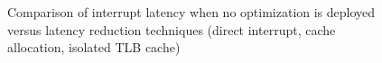 \begin{figure}[!htb]
\begin{center}
\begin{tikzpicture}[
						my brace/.style={thick, decorate, decoration={brace, amplitude=4pt, raise=4pt,},},							
						my label/.style={below right, align=center, rotate=90, inner ysep=10pt, },
					]


\end{tikzpicture}
\end{center}
\ifreport
\caption{Comparison of interrupt latency when no optimization is deployed versus latency reduction techniques (direct interrupt, cache allocation, isolated TLB cache)}
\label{plot-allopt}
\else
\label{plot-allopt2}
\fi
\end{figure}

